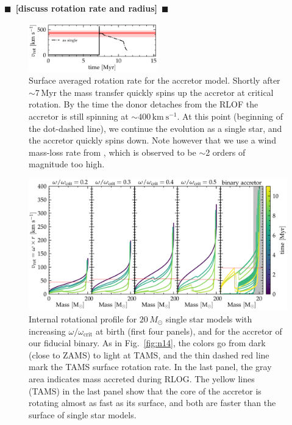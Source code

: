 \documentclass[twocolumn,twocolappendix,trackchanges]{aastex63}
\newcommand{\kms}{{\mathrm{km\ s^{-1}}}}
\DeclareRobustCommand{\Figref}[1]{Fig.~\ref{#1}}
\newcommand{\todo}[1]{{\large $\blacksquare$~\textbf{\color{red}[#1]}}~$\blacksquare$}
\begin{document}
\todo{discuss rotation rate and radius}

\begin{figure}[htbp]
  \includegraphics[width=0.5\textwidth]{zeta_rot}
  \caption{Surface averaged rotation rate for the accretor
    model. Shortly after $\sim$7\,Myr the mass transfer quickly spins
    up the accretor at critical rotation. By the time the donor
    detaches from the RLOF the accretor is still spinning at
    $\sim$$400\,\kms$. At this point (beginning of the dot-dashed line), we continue the evolution as a single star, and the accretor quickly spins down. Note however that we use a wind mass-loss rate from \cite{vink:01}, which is observed to be
    $\sim$2 orders of magnitude too high.}
  \label{fig:rot}
\end{figure}


\begin{figure}[htbp]
  \centering
  \includegraphics[width=\textwidth]{zeta_Rotational_struct}
  \caption{Internal rotational profile for $20\,M_\odot$ single star models with
    increasing $\omega/\omega_\mathrm{crit}$ at birth (first four
    panels), and for the accretor of our fiducial binary. As in \Figref{fig:n14}, the colors go from dark (close to ZAMS) to light at TAMS, and the thin dashed red line mark the TAMS surface rotation rate. In the last panel, the gray area indicates mass accreted during RLOG. The yellow lines (TAMS) in the last panel show that the core of the accretor is rotating almost as fast as its surface, and both are faster than the surface of single star models.}
\end{figure}
\end{document}
